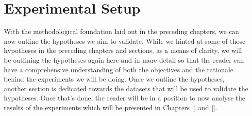 \documentclass[logo,bsc,singlespacing,parskip,online]{infthesis}
\begin{document}
\chapter{Experimental Setup}
\label{chap:experimental_setup}
With the methodological foundation laid out in the preceding chapters, we can now outline the hypotheses we aim to validate.
While we hinted at some of those hypotheses in the preceding chapters and sections, as a means of clarity, 
we will be outlining the hypotheses again here and in more detail so that the reader can have a comprehensive understanding of 
both the objectives and the rationale behind the experiments we will be doing.
Once we outline the hypotheses, another section is dedicated towards the datasets that will be used to validate the hypotheses.
Once that's done, the reader will be in a position to now analyse the results of the experiments which will be presented in Chapters \ref{} and \ref{}.
\end{document}
